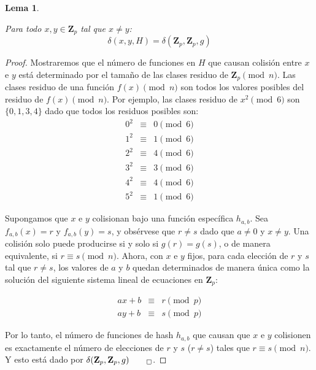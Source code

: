 \documentclass[a4paper,12pt, oneside]{article}
\newtheorem{lemma}[theorem]{Lema}
\begin{document}
\begin{lemma}\label{lemma:pair_colisions}

	Para todo $x,y \in \mathbf{Z}_p$ tal que $x \neq y$:
	\begin{equation}
		\delta(x,y,H) = \delta(\mathbf{Z}_p,\mathbf{Z}_p,g)
	\end{equation}
\end{lemma}
\begin{proof}
	Mostraremos que el número de funciones en $H$ que causan colisión entre $x$ e $y$ está determinado por el tamaño de las clases residuo de $\mathbf{Z}_p \pmod{n}$. Las clases residuo de una función $f(x) \pmod{n}$ son todos los valores posibles del residuo de $f(x) \pmod{n}$. Por ejemplo, las clases residuo de $x^2 \pmod{6}$ son $\{ 0, 1, 3, 4 \}$ dado que todos los residuos posibles son:
	\begin{equation}
		\begin{array}{lll}
			0^2 & \equiv & 0 \pmod{6}\\		
			1^2 & \equiv & 1 \pmod{6}\\	
			2^2 & \equiv & 4 \pmod{6}\\	
			3^2 & \equiv & 3 \pmod{6}\\	
			4^2 & \equiv & 4 \pmod{6}\\	
			5^2 & \equiv & 1 \pmod{6}
		\end{array}
	\end{equation}
	
	Supongamos que $x$ e $y$ colisionan bajo una función específica $h_{a,b}$. Sea $f_{a,b}(x) = r$ y $f_{a,b}(y) = s$, y obsérvese que $r\neq s$ dado que $a \neq 0$ y $x \neq y$. Una colisión solo puede producirse si y solo si $g(r) = g(s)$, o de manera equivalente, si $r \equiv s \pmod{n}$. Ahora, con $x$ e $y$ fijos, para cada elección de $r$ y $s$ tal que $r \neq s$, los valores de $a$ y $b$ quedan determinados de manera única como la solución del siguiente sistema lineal de ecuaciones en $\mathbf{Z}_p$:
	
	\begin{equation}
		\begin{array}{lll}
			ax+b & \equiv & r \pmod{p} \\
			ay+b & \equiv & s \pmod{p}
		\end{array}
	\end{equation}
	
	Por lo tanto, el número de funciones de hash $h_{a,b}$ que causan que $x$ e $y$ colisionen es exactamente el número de elecciones de $r$ y $s$ ($r \neq s$) tales que $r \equiv s \pmod{n}$. Y esto está dado por $\delta(\mathbf{Z}_p,\mathbf{Z}_p,g)_{\qed}$.
\end{proof}
\
\end{document}

